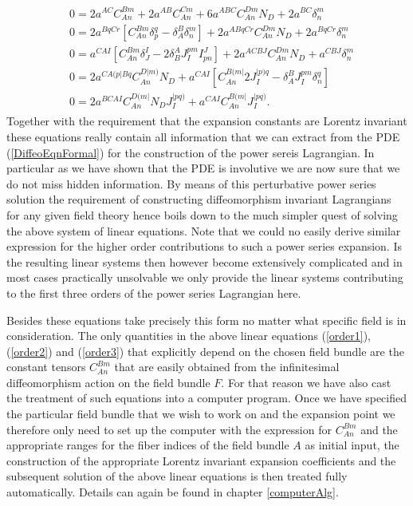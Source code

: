 \documentclass[a4paper,12pt, DIV=14, BCOR=5mm, twoside, headsepline, numbers=noenddot]{scrbook}
\begin{document}
\begin{align}\label{order3}
\begin{aligned}
&0 = 2 a^{AC}C_{An}^{Bm} + 2a^{AB}C_{An}^{Cm} + 6 a^{ABC}C_{An}^{Dm} N_D + 2a^{BC} \delta^m_n\\
&0 = 2 a^{BqCr} \left [ C_{An}^{Bm} \delta ^q_p - \delta^B_A \delta^m_n \right ] +2 a^{A Bq Cr} C_{An}^{Dm} N_D + 2 a^{BqCr} \delta^m_n\\
&0 = a^{CAI} \left [C_{An}^{Bm}\delta^I _J- 2 \delta^A_B J_I^{pm}I^J_{pn} \right ] + 2 a^{ACBJ} C_{An}^{Dm} N_D + a^{CBJ} \delta ^m _n \\
&0 = 2 a^{C A(p \vert B q} C_{An}^{D \vert m )} N_D + a^{CAI} \left [C_{An}^{B(m\vert} 2 J_{I}^{\vert p)q} - \delta_A^BJ_I^{pm}\delta^q_n \right ]\\
&0 = 2 a^{BCAI}C_{An}^{D(m\vert}N_DJ_I^{\vert pq)} + a^{CAI}C_{An}^{B(m \vert} J_I^{\vert pq)}.
\end{aligned}
\end{align}
Together with the requirement that the expansion constants are Lorentz invariant these equations really contain all information that we can extract from the PDE (\ref{DiffeoEqnFormal}) for the construction of the power sereis Lagrangian. In particular as we have shown that the PDE is involutive we are now sure that we do not miss hidden information.  By means of this perturbative power series solution the requirement of constructing diffeomorphism invariant Lagrangians for any given field theory hence boils down to the much simpler quest of solving the above system of linear equations.
Note that we could no easily derive similar expression for the higher order contributions to such a power series expansion. Is the resulting linear systems then however become extensively complicated and in most cases practically unsolvable we only provide the linear systems contributing to the first three orders of the power series Lagrangian here. 

Besides these equations take precisely this form no matter what specific field is in consideration. The only quantities in the above linear equations (\ref{order1}), (\ref{order2}) and (\ref{order3}) that explicitly depend on the chosen field bundle are the constant tensors $C_{An}^{Bm}$ that are easily obtained from the infinitesimal diffeomorphism action on the field bundle $F$.  For that reason we have also cast the treatment of such equations into a computer program. Once we have specified the particular field bundle that we wish to work on and the expansion point we therefore only need to set up the computer with the expression for $C_{An}^{Bm}$ and the appropriate ranges for the fiber indices of the field bundle $A$ as initial input, the construction of the appropriate Lorentz invariant expansion coefficients and the subsequent solution of the above linear equations is then treated fully automatically. Details can again be found in chapter \ref{computerAlg}. \\
\end{document}
